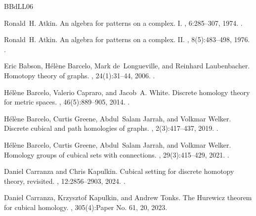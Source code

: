 \documentclass[12pt]{amsart}
\theoremstyle{plain}
\numberwithin{lemma}{\DefaultNumberTheoremWithin}
\numberwithin{claim}{\DefaultNumberTheoremWithin}
\numberwithin{theorem}{\DefaultNumberTheoremWithin}
\numberwithin{corollary}{\DefaultNumberTheoremWithin}
\numberwithin{proposition}{\DefaultNumberTheoremWithin}
\numberwithin{conjecture}{\DefaultNumberTheoremWithin}
\theoremstyle{definition}
\theoremstyle{definition}
\numberwithin{question}{\DefaultNumberTheoremWithin}
\theoremstyle{definition}
\numberwithin{problem}{\DefaultNumberTheoremWithin}
\theoremstyle{remark}
\numberwithin{remark}{\DefaultNumberTheoremWithin}
\theoremstyle{remark}
\numberwithin{example}{\DefaultNumberTheoremWithin}
\begin{document}
\begin{thebibliography}{BBdLL06}

Ronald~H. Atkin.
\newblock An algebra for patterns on a complex. {I}.
, 6:285--307, 1974.
\newblock \href {https://doi.org/10.1016/S0020-7373(74)80024-6}
  {}.

Ronald~H. Atkin.
\newblock An algebra for patterns on a complex. {II}.
, 8(5):483--498, 1976.
\newblock \href {https://doi.org/10.1016/s0020-7373(76)80015-6}
  {}.

Eric Babson, H\'el\`ene Barcelo, Mark de~Longueville, and Reinhard
  Laubenbacher.
\newblock Homotopy theory of graphs.
, 24(1):31--44, 2006.
\newblock \href {https://doi.org/10.1007/s10801-006-9100-0}
  {}.

H\'el\`ene Barcelo, Valerio Capraro, and Jacob~A. White.
\newblock Discrete homology theory for metric spaces.
, 46(5):889--905, 2014.
\newblock \href {https://doi.org/10.1112/blms/bdu043}
  {}.

H\'el\`ene Barcelo, Curtis Greene, Abdul~Salam Jarrah, and Volkmar Welker.
\newblock Discrete cubical and path homologies of graphs.
, 2(3):417--437, 2019.
\newblock \href {https://doi.org/10.5802/alco.49} {}.

H\'el\`ene Barcelo, Curtis Greene, Abdul~Salam Jarrah, and Volkmar Welker.
\newblock Homology groups of cubical sets with connections.
, 29(3):415--429, 2021.
\newblock \href {https://doi.org/10.1007/s10485-020-09621-x}
  {}.

Daniel Carranza and Chris Kapulkin.
\newblock Cubical setting for discrete homotopy theory, revisited.
, 12:2856--2903, 2024.
\newblock \href {https://doi.org/10.1112/S0010437X24007486}
  {}.

Daniel Carranza, Krzysztof Kapulkin, and Andrew Tonks.
\newblock The {H}urewicz theorem for cubical homology.
, 305(4):Paper No. 61, 20, 2023.


\end{thebibliography}
\end{document}
